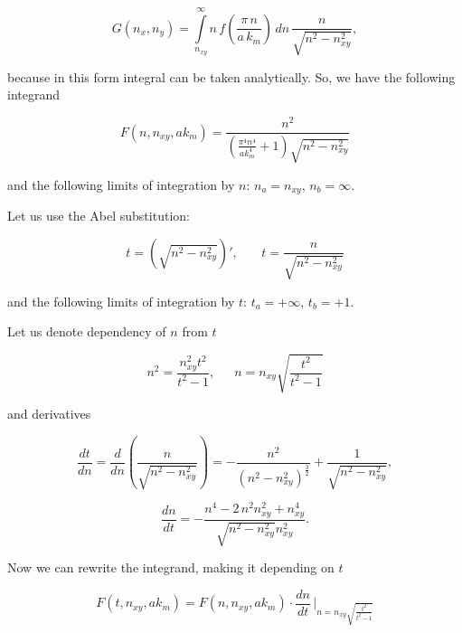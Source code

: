 \documentclass[twoside, 10pt, ptm]{article}
\begin{document}
\begin{multicols}{2}
\begin{equation}
G\left(n_x, n_y\right) = \int\limits_{n_{xy}}^{\infty}n\,
f\left(\frac{\pi\,n}{a\,k_m}\right)\,dn\,{\frac{n}{\sqrt{n^{2} - n_{xy}^{2}}}},
\end{equation}

    because in this form integral can be taken analytically. So, we have
the following integrand

\begin{equation} \label{eq:A5}
F\left(n, n_{xy}, ak_m\right) = \frac{n^{2}}{{\left(\frac{\pi^{4} n^{4}}{\mathit{ak}_{m}^{4}} + 1\right)} \sqrt{n^{2} - n_{\mathit{xy}}^{2}}}
\end{equation}

    and the following limits of integration by \(n\): \(n_a = n_{xy}\),
\(n_b = \infty\).

    Let us use the Abel substitution:

\begin{equation}
t = \left(\sqrt{n^2-n_{xy}^2}\right)', \,\,\,\,\,\,\,\,\,\,\, t = \frac{n}{\sqrt{n^{2} - n_{\mathit{xy}}^{2}}}
\end{equation}

    and the following limits of integration by \(t\): \(t_a = +\infty\),
\(t_b = +1\).

    Let us denote dependency of \(n\) from \(t\)

\begin{equation}
n^{2} = \frac{n_{\mathit{xy}}^{2} t^{2}}{t^{2} - 1}, \,\,\,\,\,\,\,\,\, n = n_{\mathit{xy}} \sqrt{\frac{t^{2}}{t^{2} - 1}}
\end{equation}

    and derivatives

    \[\frac{dt}{dn} = \frac{d}{dn} \left( \frac{n}{\sqrt{n^{2} - n_{\mathit{xy}}^{2}}} \right)= -\frac{n^{2}}{{\left(n^{2} - n_{\mathit{xy}}^{2}\right)}^{\frac{3}{2}}} + \frac{1}{\sqrt{n^{2} - n_{\mathit{xy}}^{2}}},\]

\begin{equation}
\frac{dn}{dt} = -\frac{n^{4} - 2 \, n^{2} n_{\mathit{xy}}^{2} + n_{\mathit{xy}}^{4}}{\sqrt{n^{2} - n_{\mathit{xy}}^{2}} n_{\mathit{xy}}^{2}}.
\end{equation}

    Now we can rewrite the integrand, making it depending on \(t\)

    \[F\left(t, n_{xy}, ak_m\right) = F\left(n, n_{xy}, ak_m\right) \cdot \frac{dn}{dt} \, \Bigg\rvert_{ n = n_{\mathit{xy}} \sqrt{\frac{t^{2}}{t^{2} - 1}} }\]


\end{multicols}
\end{document}
